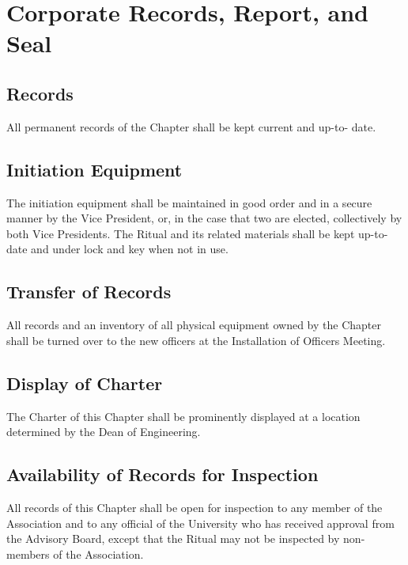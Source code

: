 \documentclass{article}
\begin{document}
	\section{Corporate Records, Report, and Seal}
	\subsection{Records}
	All permanent records of the Chapter shall be kept current and up-to- date.
	\subsection{Initiation Equipment}
	The initiation equipment shall be maintained in good order and in a secure manner by the Vice President, or, in the case that two are elected, collectively by both Vice Presidents. The Ritual and its related materials shall be kept up-to-date and under lock and key when not in use.
	\subsection{Transfer of Records}
	All records and an inventory of all physical equipment owned by the Chapter shall be turned over to the new officers at the Installation of Officers Meeting.
	\subsection{Display of Charter}
	The Charter of this Chapter shall be prominently displayed at a location determined by the Dean of Engineering.
	\subsection{Availability of Records for Inspection}
	All records of this Chapter shall be open for inspection to any member of the Association and to any official of the University who has received approval from the Advisory Board, except that the Ritual may not be inspected by non-members of the Association.
\end{document}
